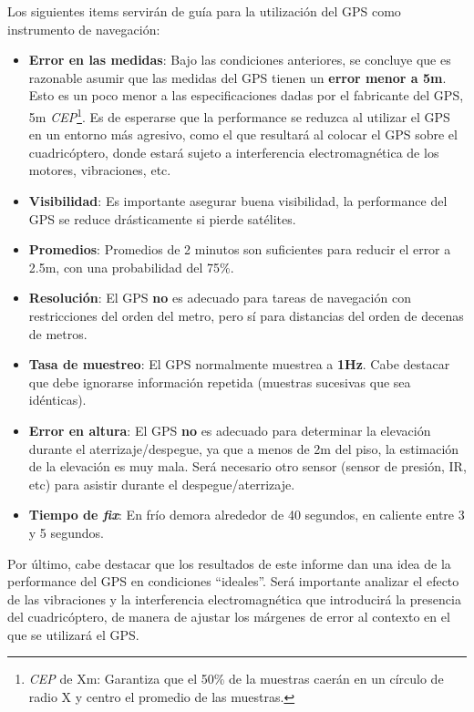 \documentclass[main]{subfiles}
\begin{document}
Los siguientes items servirán de guía para la utilización del GPS como instrumento de navegación:

\begin{itemize}
\item \textbf{Error en las medidas}: Bajo las condiciones anteriores, se concluye que es razonable asumir que las medidas del GPS tienen un \textbf{error menor a 5m}. Esto es un poco menor a las especificaciones dadas por el fabricante del GPS, 5m \emph{CEP}\footnote{\textit{CEP} de Xm: Garantiza que el 50\% de la muestras caerán en un círculo de radio X y centro el promedio de las muestras.}. Es de esperarse que la performance se reduzca al utilizar el GPS en un entorno más agresivo, como el que resultará al colocar el GPS sobre el cuadricóptero, donde estará sujeto a  interferencia electromagnética de los motores, vibraciones, etc.
\item \textbf{Visibilidad}: Es importante asegurar buena visibilidad, la performance del GPS se reduce drásticamente si pierde satélites.
\item \textbf{Promedios}: Promedios de 2 minutos son suficientes para reducir el error a 2.5m, con una probabilidad del 75\%.
\item \textbf{Resolución}: El GPS \textbf{no} es adecuado para tareas de navegación con restricciones del orden del metro, pero sí para distancias del orden de decenas de metros.
\item \textbf{Tasa de muestreo}: El GPS normalmente muestrea a \textbf{1Hz}. Cabe destacar que debe ignorarse información repetida (muestras sucesivas que sea idénticas).
\item \textbf{Error en altura}: El GPS \textbf{no} es adecuado para determinar la elevación durante el aterrizaje/despegue, ya que a menos de 2m del piso, la estimación de la elevación es muy mala. Será necesario otro sensor (sensor de presión, IR, etc) para asistir durante el despegue/aterrizaje.
\item \textbf{Tiempo de \textit{fix}}: En frío demora alrededor de 40 segundos, en caliente entre 3 y 5 segundos.
\end{itemize}

Por último, cabe destacar que los resultados de este informe dan una idea de la performance del GPS en condiciones ``ideales''. Será importante analizar el efecto de las vibraciones y la interferencia electromagnética que introducirá la presencia del cuadricóptero, de manera de ajustar los márgenes de error al contexto en el que se utilizará el GPS.
\end{document}
